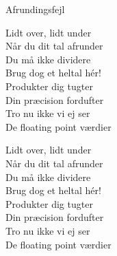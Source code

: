 \begin{song}{Afrundingsfejl}
  \begin{SBChorus}
    Lidt over, lidt under\\
    Når du dit tal afrunder\\
    Du må ikke dividere\\
    Brug dog et heltal hér!\\
    \medskip
    Produkter dig tugter\\
    Din præcision fordufter\\
    Tro nu ikke vi ej ser\\
    De floating point værdier
  \end{SBChorus}

  \begin{SBChorus}
    Lidt over, lidt under\\
    Når du dit tal afrunder\\
    Du må ikke dividere\\
    Brug dog et heltal hér!\\
    \medskip
    Produkter dig tugter\\
    Din præcision fordufter\\
    Tro nu ikke vi ej ser\\
    De floating point værdier
  \end{SBChorus}
\end{song}